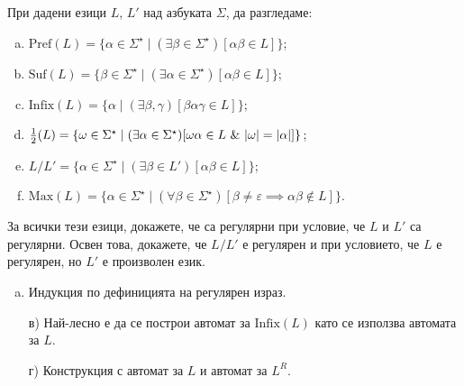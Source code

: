\begin{problem}
  При дадени езици $L$, $L'$ над азбуката $\Sigma$, да разгледаме:
  \begin{enumerate}[a)]
  \item
    $\mbox{Pref}(L) = \{\alpha \in \Sigma^\star \mid (\exists \beta \in \Sigma^\star)[\alpha\beta \in L]\}$;
  \item
    $\mbox{Suf}(L) = \{\beta \in \Sigma^\star \mid (\exists \alpha \in \Sigma^\star)[\alpha\beta \in L]\}$;
  \item
    $\text{Infix}(L) = \{\alpha \mid (\exists \beta,\gamma)[\beta\alpha\gamma \in L]\}$;
  \item 
    $\frac{1}{2}(L) = \{\omega \in \Sigma^\star \mid (\exists \alpha \in \Sigma^\star)[\omega\alpha \in L\ \&\ \abs{\omega} = \abs{\alpha}]\}$;
  \item
    $L/L' = \{\alpha \in \Sigma^\star \mid (\exists \beta \in L')[\alpha\beta \in L]\}$;
  \item
    $\mbox{Max}(L) = \{\alpha \in \Sigma^\star \mid (\forall \beta\in\Sigma^\star)[\beta \neq \varepsilon\implies \alpha\beta \not\in L]\}$.
  \end{enumerate}
  За всички тези езици, докажете, че са регулярни при условие, че $L$ и $L'$ са регулярни.
  Освен това, докажете, че $L/L'$ е регулярен и при условието, че $L$ е регулярен, но $L'$ е произволен език.
\end{problem}
\begin{hint}
  \begin{enumerate}[a)]
  \item 
    Индукция по дефиницията на регулярен израз.
  \item[в)]
    Най-лесно е да се построи автомат за $\text{Infix}(L)$ като се използва автомата за $L$.
  \item[г)]
    Конструкция с автомат за $L$ и автомат за $L^R$.
  \end{enumerate}
\end{hint}

